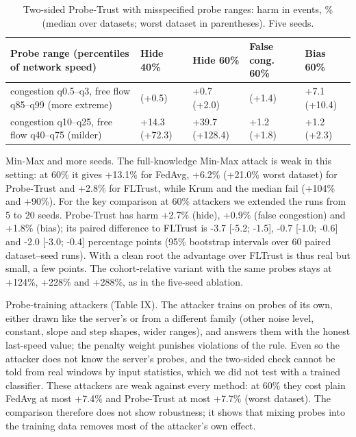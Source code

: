\documentclass[journal]{IEEEtran}
\begin{document}
\begin{table}[!t]
\caption{Two-sided Probe-Trust with misspecified probe ranges: harm in events, \% (median over datasets; worst dataset in parentheses). Five seeds.}
\centering
\footnotesize
\renewcommand{\arraystretch}{1.12}
\begin{tabular}{|>{\raggedright\arraybackslash}p{6.75cm}|>{\raggedright\arraybackslash}p{2.15cm}|>{\raggedright\arraybackslash}p{2.15cm}|>{\raggedright\arraybackslash}p{2.35cm}|>{\raggedright\arraybackslash}p{2.15cm}|}
\hline
\textbf{Probe range (percentiles of network speed)} & \textbf{Hide 40\%} & \textbf{Hide 60\%} & \textbf{False cong. 60\%} & \textbf{Bias 60\%} \\
\hline
congestion q0.5--q3, free flow q85--q99 (more extreme) & -0.6 (+0.5) & +0.7 (+2.0) & -0.1 (+1.4) & +7.1 (+10.4) \\
\hline
congestion q10--q25, free flow q40--q75 (milder) & +14.3 (+72.3) & +39.7 (+128.4) & +1.2 (+1.8) & +1.2 (+2.3) \\
\hline
\end{tabular}
\end{table}
Min-Max and more seeds. The full-knowledge Min-Max attack \cite{minmax} is weak in this setting: at 60\% it gives +13.1\% for FedAvg, +6.2\% (+21.0\% worst dataset) for Probe-Trust and +2.8\% for FLTrust, while Krum and the median fail (+104\% and +90\%). For the key comparison at 60\% attackers we extended the runs from 5 to 20 seeds. Probe-Trust has harm +2.7\% (hide), +0.9\% (false congestion) and +1.8\% (bias); its paired difference to FLTrust is -3.7 [-5.2; -1.5], -0.7 [-1.0; -0.6] and -2.0 [-3.0; -0.4] percentage points (95\% bootstrap intervals over 60 paired dataset--seed runs). With a clean root the advantage over FLTrust is thus real but small, a few points. The cohort-relative variant with the same probes stays at +124\%, +228\% and +288\%, as in the five-seed ablation.

Probe-training attackers (Table IX). The attacker trains on probes of its own, either drawn like the server's or from a different family (other noise level, constant, slope and step shapes, wider ranges), and answers them with the honest last-speed value; the penalty weight punishes violations of the rule. Even so the attacker does not know the server's probes, and the two-sided check cannot be told from real windows by input statistics, which we did not test with a trained classifier. These attackers are weak against every method: at 60\% they cost plain FedAvg at most +7.4\% and Probe-Trust at most +7.7\% (worst dataset). The comparison therefore does not show robustness; it shows that mixing probes into the training data removes most of the attacker's own effect.
\end{document}
